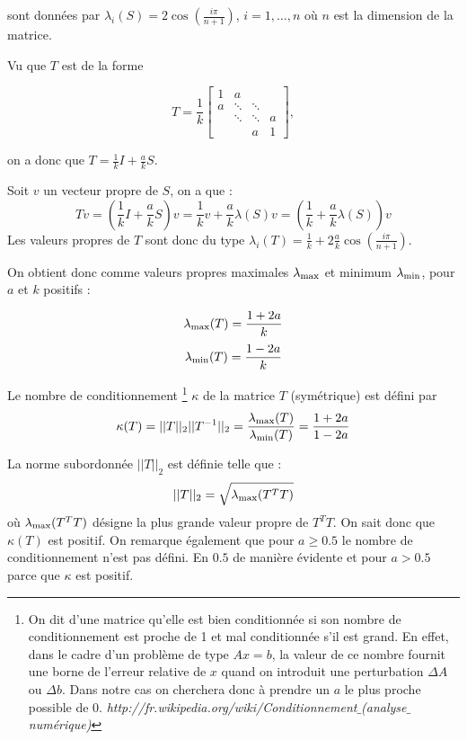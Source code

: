sont données par $\lambda_i(S) = 2 \cos(\frac{i\pi}{n+1})$, $i= 1, \ldots , n$ où $n$ est la dimension de la matrice.

Vu que $T$ est de la forme

$$
 T = \frac{1}{k}
 \begin{bmatrix}
    1 & a 		& 			& \\
    a & \ddots 	& \ddots 	& \\
      & \ddots 	& \ddots 	& a \\
      & 		& a			& 1
  \end{bmatrix},
$$

on a donc que $T = \frac{1}{k} I + \frac{a}{k} S$.

Soit $v$ un vecteur propre de $S$, on a que :
\begin{equation}
T v = \left( \frac{1}{k} I + \frac{a}{k} S \right) v =
\frac{1}{k} v + \frac{a}{k} \lambda(S) v = \left(\frac{1}{k} + \frac{a}{k} \lambda(S)\right) v
\end{equation}
Les valeurs propres de $T$ sont donc du type $\lambda_i(T) = \frac{1}{k} + 2 \frac{a}{k} \cos(\frac{i\pi}{n+1})$.

On obtient donc comme valeurs propres maximales $\lambda_\mathrm{max}$ et minimum $\lambda_\mathrm{min}$,
pour $a$ et $k$ positifs :

$$\lambda_\mathrm{max} (T) =  \frac{1+2a}{k} $$
$$\lambda_\mathrm{min} (T) =  \frac{1-2a}{k} $$

Le nombre de conditionnement
\footnote{On dit d'une matrice qu'elle est bien conditionnée si son nombre de conditionnement
  est proche de 1 et mal conditionnée s'il est grand.
En effet, dans le cadre d'un problème de type $Ax = b$,
la valeur de ce nombre fournit une borne de l'erreur relative de $x$ quand on introduit une perturbation $\Delta A $ ou $\Delta b$.
Dans notre cas on cherchera donc à prendre un $a$ le plus proche possible de 0.
\textit{http://fr.wikipedia.org/wiki/Conditionnement$\_$(analyse$\_$numérique)}}
 $\kappa$ de la matrice $T$ (symétrique) est défini par
\begin{equation}
	\kappa (T) = ||T||_2||T^{-1}||_2 = \frac{\lambda_\mathrm{max} (T)}{\lambda_\mathrm{min} (T)} = \frac{1+2a}{1-2a}
\end{equation}

La norme subordonnée $||T||_2$ est définie telle que :
$$||T||_2 = \sqrt{\lambda_\mathrm{max}(T^TT)}$$
où $\lambda_\mathrm{max}(T^TT)$ désigne la plus grande valeur propre de $T^TT$.
On sait donc que $\kappa(T) $ est positif.
On remarque également que pour $a \geq 0.5$ le nombre de conditionnement n'est pas défini.
En $0.5$ de manière évidente et pour $a > 0.5$ parce que $\kappa$ est positif.


